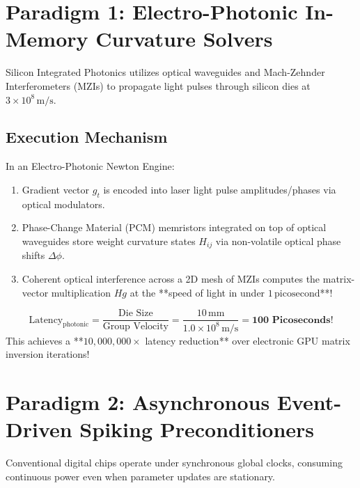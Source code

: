 \section{Paradigm 1: Electro-Photonic In-Memory Curvature Solvers}
Silicon Integrated Photonics utilizes optical waveguides and Mach-Zehnder Interferometers (MZIs) to propagate light pulses through silicon dies at $3 \times 10^8\,\text{m/s}$.

\subsection{Execution Mechanism}
In an Electro-Photonic Newton Engine:
\begin{enumerate}[leftmargin=*]
    \item Gradient vector $g_t$ is encoded into laser light pulse amplitudes/phases via optical modulators.
    \item Phase-Change Material (PCM) memristors integrated on top of optical waveguides store weight curvature states $H_{ij}$ via non-volatile optical phase shifts $\Delta \phi$.
    \item Coherent optical interference across a 2D mesh of MZIs computes the matrix-vector multiplication $H g$ at the **speed of light in under $1\,\text{picosecond}$**!
\end{enumerate}

\begin{mathbox}
$$\text{Latency}_{\text{photonic}} = \frac{\text{Die Size}}{\text{Group Velocity}} = \frac{10\,\text{mm}}{1.0 \times 10^8\,\text{m/s}} = \mathbf{100 \text{ Picoseconds!}}$$
This achieves a **$10,000,000\times$ latency reduction** over electronic GPU matrix inversion iterations!
\end{mathbox}


\section{Paradigm 2: Asynchronous Event-Driven Spiking Preconditioners}
Conventional digital chips operate under synchronous global clocks, consuming continuous power even when parameter updates are stationary.

